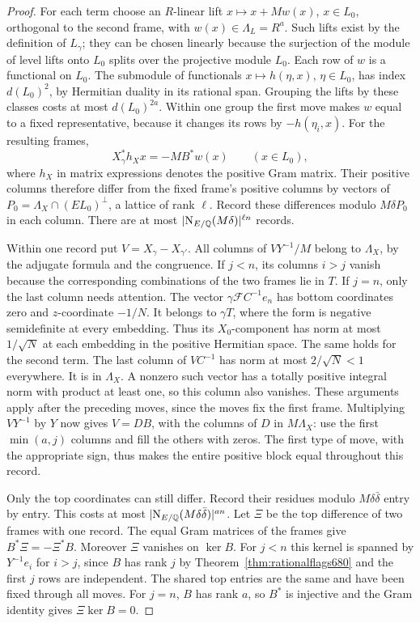 \documentclass[a4paper,11pt]{article}
\theoremstyle{definition}
\theoremstyle{remark}
\numberwithin{equation}{section}
\begin{document}
\begin{proof}
For each term choose an \(R\)-linear lift
\(x\mapsto x+M w(x)\), \(x\in L_0\), orthogonal to the
second frame, with \(w(x)\in\Lambda_L=R^a\).
Such lifts exist by the definition of \(L_\gamma\); they
can be chosen linearly because the surjection of the module
of level lifts onto \(L_0\) splits over the projective
module \(L_0\). Each row of \(w\) is a functional on \(L_0\).
The submodule of functionals \(x\mapsto h(\eta,x)\),
\(\eta\in L_0\), has index \(d(L_0)^2\), by Hermitian
duality in its rational span. Grouping the lifts by these
classes costs at most \(d(L_0)^{2a}\). Within one group the
first move makes \(w\) equal to a fixed representative,
because it changes its rows by \(-h(\eta_i,x)\).
For the resulting frames,
\[
                    X_\gamma^*h_X x=-M B^*w(x)
                           \qquad(x\in L_0),
\]
where \(h_X\) in matrix expressions denotes the positive
Gram matrix. Their positive columns therefore differ from
the fixed frame's positive columns by vectors of
\(P_0=\Lambda_X\cap(EL_0)^\perp\), a lattice of rank \(\ell\).
Record these differences modulo \(M\delta P_0\) in each
column. There are at most
\(|{\rm N}_{E/\mathbb Q}(M\delta)|^{\ell n}\) records.

Within one record put \(V=X_\gamma-X_{\gamma'}\).
All columns of \(VY^{-1}/M\) belong to \(\Lambda_X\), by
the adjugate formula and the congruence. If \(j<n\), its
columns \(i>j\) vanish because the corresponding combinations
of the two frames lie in \(T\). If \(j=n\), only the last
column needs attention. The vector
\(\gamma\mathcal F C^{-1}e_n\) has bottom coordinates zero
and \(z\)-coordinate \(-1/N\). It belongs to \(\gamma T\),
where the form is negative semidefinite at every embedding.
Thus its \(X_0\)-component has norm at most \(1/\sqrt N\)
at each embedding in the positive Hermitian space.
The same holds for the second term. The last column of
\(VC^{-1}\) has norm at most \(2/\sqrt N<1\) everywhere.
It is in \(\Lambda_X\). A nonzero such vector has a totally
positive integral norm with product at least one, so this
column also vanishes. These arguments apply after the
preceding moves, since the moves fix the first frame.
Multiplying \(VY^{-1}\) by \(Y\) now gives \(V=D B\), with
the columns of \(D\) in \(M\Lambda_X\): use the first
\(\min(a,j)\) columns and fill the others with zeros. The
first type of move, with the appropriate sign, thus makes
the entire positive block equal throughout this record.

Only the top coordinates can still differ. Record their
residues modulo \(M\delta\bar\delta\) entry by entry. This
costs at most \(|{\rm N}_{E/\mathbb Q}(M\delta\bar\delta)|^{an}\).
Let \(\Xi\) be the top difference of two frames with one
record. The equal Gram matrices of the frames give
\(B^*\Xi=-\Xi^*B\). Moreover \(\Xi\) vanishes on \(\ker B\).
For \(j<n\) this kernel is spanned by \(Y^{-1}e_i\) for
\(i>j\), since \(B\) has rank \(j\) by
Theorem~\ref{thm:rationalflags680} and the first \(j\)
rows are independent. The shared top entries are the same
and have been fixed through all moves. For \(j=n\), \(B\)
has rank \(a\), so \(B^*\) is injective and the Gram identity
gives \(\Xi\ker B=0\).


\end{proof}
\end{document}
